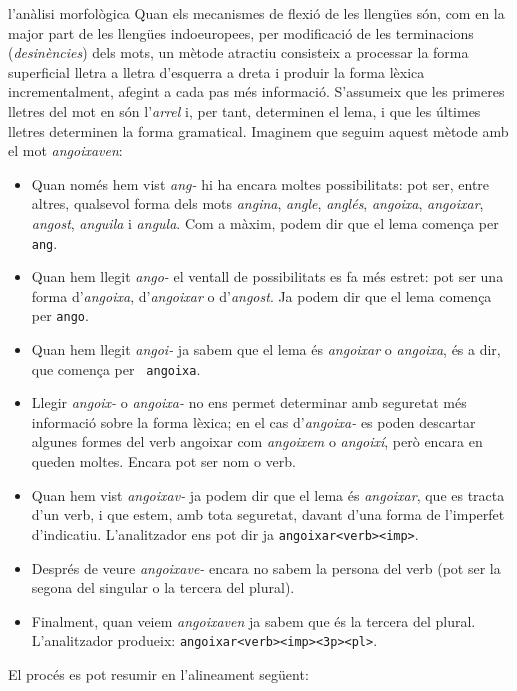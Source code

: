 \begin{persabermes}{l'anàlisi morfològica}
  Quan els mecanismes de flexió de les llengües són, com en la major
  part de les llengües indoeuropees, per modificació de les
  terminacions (\emph{desi\-nèn\-cies}) dels mots, un mètode atractiu
  consisteix a processar la forma superficial lletra a lletra
  d'esquerra a dreta i produir la forma lèxica incrementalment,
  afegint a cada pas més informació. S'assumeix que les primeres
  lletres del mot en són l'\emph{arrel} i, per tant, determinen el
  lema, i que les últimes lletres determinen la forma
  gramatical. Imaginem que seguim aquest mètode amb el mot
  \emph{angoixaven}:
\begin{itemize}
\item Quan només hem vist \emph{ang-} hi ha encara moltes
  possibilitats: pot ser, entre altres, qualsevol forma dels mots
  \emph{angina}, \emph{angle}, \emph{anglés}, \emph{angoixa},
  \emph{angoixar}, \emph{angost}, {\em anguila} i \emph{angula}. Com a
  màxim, podem dir que el lema comença per {\tt ang}.
\item Quan hem llegit \emph{ango-} el ventall de possibilitats es fa
  més estret: pot ser una forma d'\emph{angoixa}, d'\emph{angoixar} o
  d'\emph{angost}. Ja podem dir que el lema comença per {\tt ango}.
\item Quan hem llegit \emph{angoi-} ja sabem que el lema és
  \emph{angoixar} o \emph{angoixa}, és a dir, que comença per {\tt
    angoixa}.
\item Llegir \emph{angoix-} o \emph{angoixa-} no ens permet determinar
  amb seguretat més informació sobre la forma lèxica; en el cas
  d'\emph{angoixa-} es poden descartar algunes formes del verb
  angoixar com \emph{angoixem} o \emph{angoixí}, però encara en queden
  moltes. Encara pot ser nom o verb.
\item Quan hem vist \emph{angoixav-} ja podem dir que el lema és
  \emph{angoixar}, que es tracta d'un verb, i que estem, amb tota
  seguretat, davant d'una forma de l'imperfet
  d'indicatiu. L'analitzador ens pot dir ja
  \texttt{angoixar<verb><imp>}.
\item Després de veure \emph{angoixave-} encara no sabem la persona
  del verb (pot ser la segona del singular o la tercera del plural).
\item Finalment, quan veiem \emph{angoixaven} ja sabem que és la
  tercera del plural. L'analitzador produeix:
  \texttt{angoixar<verb><imp><3p><pl>}.
\end{itemize}
El procés es pot resumir en l'alineament següent:

\end{persabermes}
